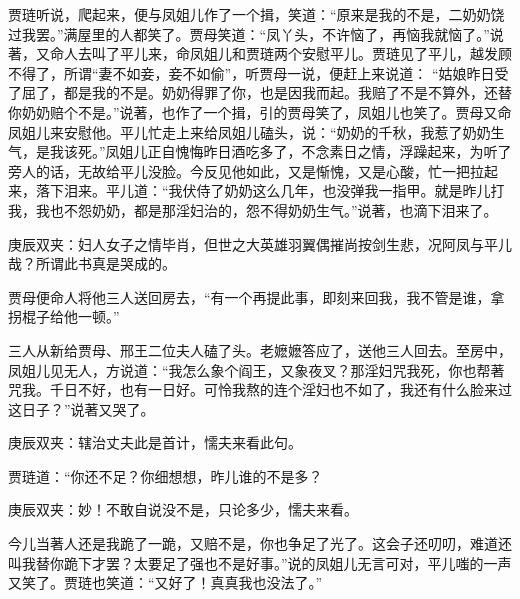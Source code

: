 \begin{parag}
    贾琏听说，爬起来，便与凤姐儿作了一个揖，笑道：“原来是我的不是，二奶奶饶过我罢。”满屋里的人都笑了。贾母笑道：“凤丫头，不许恼了，再恼我就恼了。”说著，又命人去叫了平儿来，命凤姐儿和贾琏两个安慰平儿。贾琏见了平儿，越发顾不得了，所谓“妻不如妾，妾不如偷”，听贾母一说，便赶上来说道： “姑娘昨日受了屈了，都是我的不是。奶奶得罪了你，也是因我而起。我赔了不是不算外，还替你奶奶赔个不是。”说著，也作了一个揖，引的贾母笑了，凤姐儿也笑了。贾母又命凤姐儿来安慰他。平儿忙走上来给凤姐儿磕头，说：“奶奶的千秋，我惹了奶奶生气，是我该死。”凤姐儿正自愧悔昨日酒吃多了，不念素日之情，浮躁起来，为听了旁人的话，无故给平儿没脸。今反见他如此，又是惭愧，又是心酸，忙一把拉起来，落下泪来。平儿道：“我伏侍了奶奶这么几年，也没弹我一指甲。就是昨儿打我，我也不怨奶奶，都是那淫妇治的，怨不得奶奶生气。”说著，也滴下泪来了。\begin{note}庚辰双夹：妇人女子之情毕肖，但世之大英雄羽翼偶摧尚按剑生悲，况阿凤与平儿哉？所谓此书真是哭成的。\end{note}贾母便命人将他三人送回房去，“有一个再提此事，即刻来回我，我不管是谁，拿拐棍子给他一顿。”
\end{parag}


\begin{parag}
    三人从新给贾母、邢王二位夫人磕了头。老嬷嬷答应了，送他三人回去。至房中，凤姐儿见无人，方说道：“我怎么象个阎王，又象夜叉？那淫妇咒我死，你也帮著咒我。千日不好，也有一日好。可怜我熬的连个淫妇也不如了，我还有什么脸来过这日子？”说著又哭了。\begin{note}庚辰双夹：辖治丈夫此是首计，懦夫来看此句。\end{note}贾琏道：“你还不足？你细想想，昨儿谁的不是多？\begin{note}庚辰双夹：妙！不敢自说没不是，只论多少，懦夫来看。\end{note}今儿当著人还是我跪了一跪，又赔不是，你也争足了光了。这会子还叨叨，难道还叫我替你跪下才罢？太要足了强也不是好事。”说的凤姐儿无言可对，平儿嗤的一声又笑了。贾琏也笑道：“又好了！真真我也没法了。”
\end{parag}


